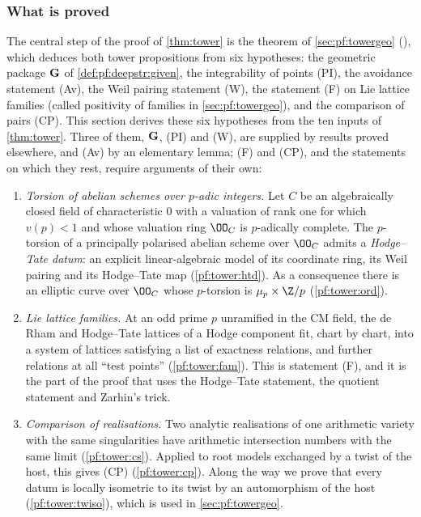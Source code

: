 \subsubsection*{What is proved}
The central step of the proof of \cref{thm:tower} is the theorem of \cref{sec:pf:towergeo}
(), which deduces both tower propositions
from six hypotheses: the geometric package $\mathbf G$ of \cref{def:pf:deepstr:given}, the integrability of
points (PI), the avoidance statement (Av), the Weil pairing statement (W), the statement (F) on Lie lattice
families (called positivity of families in \cref{sec:pf:towergeo}), and the comparison of pairs (CP). This
section derives these six hypotheses from the ten inputs of \cref{thm:tower}. Three of them, $\mathbf G$, (PI)
and (W), are supplied by results proved elsewhere, and (Av) by an elementary lemma; (F) and (CP), and the
statements on which they rest, require arguments of their own:
\begin{enumerate}[label=(\arabic*)]
\item\emph{Torsion of abelian schemes over $p$-adic integers.} Let $C$ be an algebraically closed field of
  characteristic $0$ with a valuation of rank one for which $v(p)<1$ and whose valuation ring $\OO_C$ is
  $p$-adically complete. The $p$-torsion of a principally polarised abelian scheme over $\OO_C$ admits a
  \emph{Hodge--Tate datum}: an explicit linear-algebraic model of its coordinate ring, its Weil pairing and its
  Hodge--Tate map (\cref{pf:tower:htd}). As a consequence there is an elliptic curve over $\OO_C$ whose
  $p$-torsion is $\mu_p\times\Z/p$ (\cref{pf:tower:ord}).
\item\emph{Lie lattice families.} At an odd prime $p$ unramified in the CM field, the de Rham and
  Hodge--Tate lattices of a Hodge component fit, chart by chart, into a system of lattices satisfying a
  list of exactness relations, and further relations at all ``test points'' (\cref{pf:tower:fam}). This is
  statement (F), and it is the part of the proof that uses the Hodge--Tate statement, the quotient
  statement and Zarhin's trick.
\item\emph{Comparison of realisations.} Two analytic realisations of one arithmetic variety with the same
  singularities have arithmetic intersection numbers with the same limit (\cref{pf:tower:cs}). Applied to
  root models exchanged by a twist of the host, this gives (CP) (\cref{pf:tower:cp}). Along the way we prove
  that every datum is locally isometric to its twist by an automorphism of the host (\cref{pf:tower:twiso}),
  which is used in \cref{sec:pf:towergeo}.
\end{enumerate}


